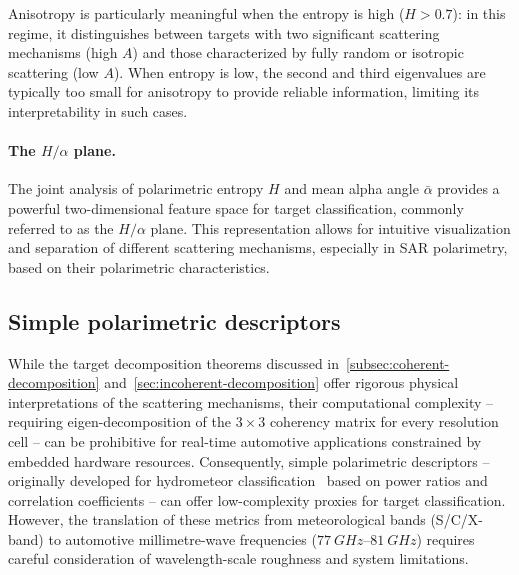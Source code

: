 Anisotropy is particularly meaningful when the entropy is high ($H > 0.7$): in this regime, it distinguishes between targets with two significant scattering mechanisms (high $A$) and those characterized by fully random or isotropic scattering (low $A$).
When entropy is low, the second and third eigenvalues are typically too small for anisotropy to provide reliable information, limiting its interpretability in such cases.

\paragraph{The $H/\alpha$ plane.} The joint analysis of polarimetric entropy $H$ and mean alpha angle $\bar{\alpha}$ provides a powerful two-dimensional feature space for target classification, commonly referred to as the $H/\alpha$ plane.
This representation allows for intuitive visualization and separation of different scattering mechanisms, especially in SAR polarimetry, based on their polarimetric characteristics.


\subsection{Simple polarimetric descriptors}
\label{sec:simple-polarimetric-descriptors}

While the target decomposition theorems discussed in~\cref{subsec:coherent-decomposition} and~\cref{sec:incoherent-decomposition} offer rigorous physical interpretations of the scattering mechanisms, their computational complexity -- requiring eigen-decomposition of the $3\times3$ coherency matrix for every resolution cell -- can be prohibitive for real-time automotive applications constrained by embedded hardware resources.
Consequently, simple polarimetric descriptors -- originally developed for hydrometeor classification~\parencite{bringiPolarimetricDopplerWeather2001} based on power ratios and correlation coefficients -- can offer low-complexity proxies for target classification.
However, the translation of these metrics from meteorological bands (S/C/X-band) to automotive millimetre-wave frequencies ($\qtyrange{77}{81}{GHz}$) requires careful consideration of wavelength-scale roughness and system limitations.

